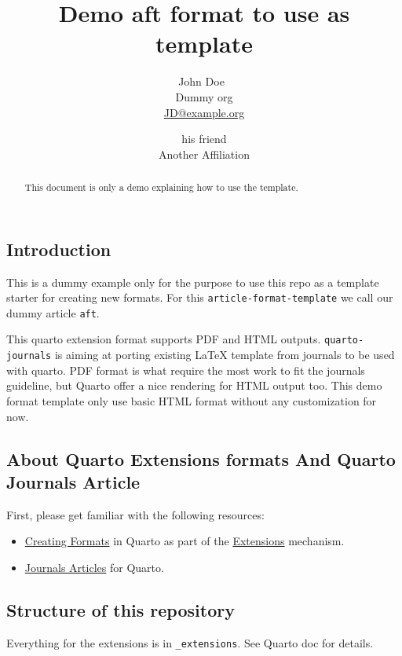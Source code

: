 \documentclass[
]{aft}
\title{Demo aft format to use as template}
\author{
John Doe~\orcidlink{0000-0000-0000-0000}\\Dummy
org\\\href{mailto:JD@example.org}{JD@example.org}\and 
his friend\\Another Affiliation\\}
\date{}
\providecommand{\tightlist}{%
  \setlength{\itemsep}{0pt}\setlength{\parskip}{0pt}}\usepackage{longtable,booktabs,array}
\begin{document}
\maketitle
\begin{abstract}
This document is only a demo explaining how to use the template.
\end{abstract}

\subsection{Introduction}\label{sec-intro}

This is a dummy example only for the purpose to use this repo as a
template starter for creating new formats. For this
\texttt{article-format-template} we call our dummy article \texttt{aft}.

This quarto extension format supports PDF and HTML outputs.
\texttt{quarto-journals} is aiming at porting existing {\LaTeX} template
from journals to be used with quarto. PDF format is what require the
most work to fit the journals guideline, but Quarto offer a nice
rendering for HTML output too. This demo format template only use basic
HTML format without any customization for now.

\subsection{About Quarto Extensions formats And Quarto Journals
Article}\label{about-quarto-extensions-formats-and-quarto-journals-article}

First, please get familiar with the following resources:

\begin{itemize}
\tightlist
\item
  \href{https://quarto.org/docs/extensions/formats.html}{Creating
  Formats} in Quarto as part of the
  \href{https://quarto.org/docs/extensions/}{Extensions} mechanism.
\item
  \href{https://quarto.org/docs/journals/}{Journals Articles} for
  Quarto.
\end{itemize}

\subsection{Structure of this
repository}\label{structure-of-this-repository}

Everything for the extensions is in \texttt{\_extensions}. See Quarto
doc for details.
\end{document}
